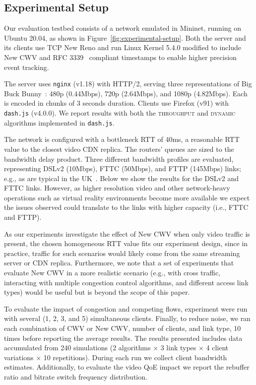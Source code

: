 \documentclass[10pt,sigconf]{acmart}
\begin{document}
\subsection{Experimental Setup}
\label{sec:experimental-setup}

Our evaluation testbed consists of a network emulated in Mininet, running on Ubuntu 20.04, as shown in Figure~\ref{fig:experimental-setup}. Both the server and its clients use TCP New Reno and run Linux Kernel 5.4.0 modified to include New CWV and RFC 3339~\cite{rfc3339-precise-timestamps} compliant timestamps to enable higher precision event tracking. 

The server uses \texttt{nginx} (v1.18) with HTTP/2, serving three representations of Big Buck Bunny~\cite{online-bbb}: 480p (0.44Mbps), 720p (2.64Mbps), and 1080p (4.82Mbps). Each is encoded in chunks of 3 seconds duration.
Clients use Firefox (v91) with \texttt{dash.js} (v4.0.0). We
report results with both the \textsc{throughput} and \textsc{dynamic} \cite{Spiteri-2019-from-theory-to-practice-sabre} algorithms implemented in \texttt{dash.js}.

The network is configured with a bottleneck RTT of 40ms, a reasonable RTT value to the closest video CDN replica. The routers' queues are sized to the bandwidth delay product. Three different bandwidth profiles are evaluated, representing DSLv2 (10Mbps), FTTC (50Mbps), and FTTP (145Mbps) links; e.g., as are typical in the UK~\cite{online-ofcom-report}. Below we show the results for the DSLv2 and FTTC links. However, as higher resolution video and other network-heavy operations such as virtual reality environments become more available we expect the issues observed could translate to the links with higher capacity (i.e., FTTC and FTTP).

As our experiments investigate the effect of New CWV when only video traffic is present, the chosen homogeneous RTT value fits our experiment design, since in practice, traffic for such scenarios would likely come from the same streaming server or CDN replica. Furthermore, we note that a set of experiments that evaluate New CWV in a more realistic scenario (e.g., with cross traffic, interacting with multiple congestion control algorithms, and different access link types) would be useful but is beyond the scope of this paper.

To evaluate the impact of congestion and competing flows, experiment were run with several (1, 2, 3, and 5) simultaneous clients. Finally, to reduce noise, we ran each combination of CWV or New CWV, number of clients, and link type, 10 times before reporting the average results. The results presented includes data accumulated from 240 simulations (2 algorithms $\times$ 3 link types $\times$ 4 client variations $\times$ 10 repetitions). 
During each run we collect client bandwidth estimates. Additionally, to evaluate the video QoE impact we report the rebuffer ratio and bitrate switch frequency distribution.
\end{document}
